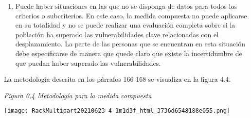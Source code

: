 \documentclass[
]{book}
\begin{document}
\begin{enumerate}
\item
  Puede haber situaciones en las que no se disponga de datos para todos los criterios o subcriterios. En este caso, la medida compuesta no puede aplicarse en su totalidad y no se puede realizar una evaluación completa sobre si la población ha superado las vulnerabilidades clave relacionadas con el desplazamiento. La parte de las personas que se encuentran en esta situación debe especificarse de manera que quede claro que existe la incertidumbre de que puedan haber superado las vulnerabilidades.
\end{enumerate}

La metodología descrita en los párrafos 166-168 se visualiza en la figura 4.4.

\emph{Figura 0.4 Metodología para la medida compuesta}

\texttt{[image: RackMultipart20210623-4-1m1d3f\_html\_3736d6548188e055.png]}
\end{document}
